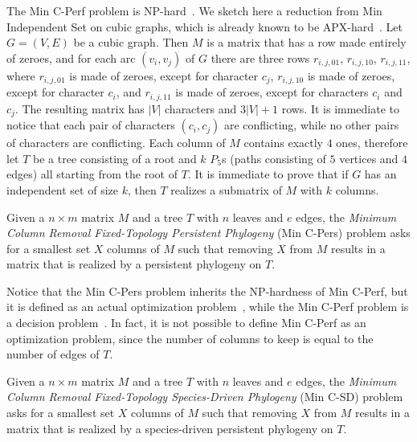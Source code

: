 The Min C-Perf problem is NP-hard~\cite{karp_reducibility_1972}.
We sketch here a reduction from Min Independent Set on cubic graphs,
which is already known to be APX-hard~\cite{alimonti_apx-completeness_2000}.
Let $G=(V,E)$ be a cubic graph.
Then $M$ is a matrix that has a row made entirely of zeroes, and for
each arc $(v_{i}, v_{j})$ of $G$ there are three rows $r_{i,j,01}$,
$r_{i,j,10}$, $r_{i,j,11}$, where  $r_{i,j,01}$ is made of zeroes,
except for character $c_{j}$,
$r_{i,j,10}$  is made of zeroes,
except for character $c_{i}$, and $r_{i,j,11}$  is made of zeroes,
except for characters $c_{i}$ and $c_{j}$.
The resulting matrix has $|V|$ characters and $3|V|+1$ rows.
It is immediate to notice that each pair of characters $(c_{i},
c_{j})$ are conflicting, while no other pairs of characters are conflicting.
Each column of $M$ contains exactly $4$ ones, therefore let $T$ be a tree
consisting of a root and $k$ $P_{5}$s (paths consisting of $5$
vertices and $4$ edges) all starting from the root of $T$.
It is immediate to prove that if $G$ has an independent set of size
$k$, then $T$ realizes a submatrix of $M$ with $k$ columns.



\begin{definition}
\label{definition:persistent-problem}
Given a $n\times m$ matrix $M$ and a tree $T$ with $n$ leaves and $e$
edges, the
\emph{Minimum Column Removal Fixed-Topology Persistent Phylogeny} (Min
C-Pers) problem asks for a smallest set $X$ columns of $M$ such
that removing $X$ from $M$ results in a matrix that is realized by a
persistent phylogeny on $T$.
\end{definition}

Notice that the Min C-Pers problem inherits the NP-hardness of Min
C-Perf, but it is defined as an actual optimization
problem~\cite{ausiello_approximate_1995}, while the Min C-Perf problem
is a decision problem~\cite{garey_computer_1979}.
In fact, it is not possible to define  Min C-Perf as an optimization
problem, since the number of columns to keep is equal to the number of
edges of $T$.

\begin{definition}
\label{definition:species-driven-problem}
Given a $n\times m$ matrix $M$ and a tree $T$ with $n$ leaves and $e$
edges, the
\emph{Minimum Column Removal Fixed-Topology Species-Driven Phylogeny} (Min
C-SD) problem asks for a smallest set $X$ columns of $M$ such
that removing $X$ from $M$ results in a matrix that is realized by a
species-driven persistent phylogeny on $T$.
\end{definition}


